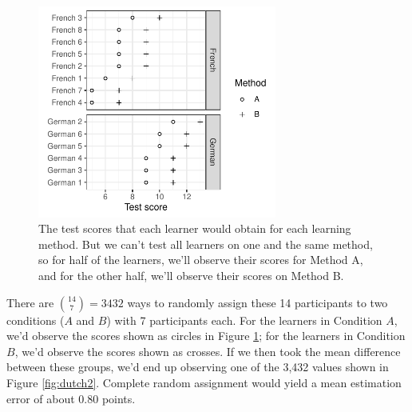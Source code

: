 \documentclass[a4paper]{tufte-book}\usepackage[]{graphicx}\usepackage[]{xcolor}
\begin{document}
\begin{figure}[htbp]
  \centering
  \includegraphics[width = 0.7\textwidth]{figure/dutch-1}
  \caption{The test scores that each learner would obtain for each learning method. But we can't test all learners on one and the same method, so for half of the learners, we'll observe their scores for Method A, and for the other half, we'll observe their scores on Method B.}
  \label{fig:dutch}
\end{figure}

There are ${14 \choose 7} = 3432$ ways to randomly assign these 14 participants to
two conditions ($A$ and $B$) with 7 participants each.
For the learners in Condition $A$, we'd observe the scores
shown as circles in Figure \ref{fig:dutch};
for the learners in Condition $B$, we'd observe the scores
shown as crosses. If we then took the mean difference between
these groups, we'd end up observing one of the 3,432 values
shown in Figure \vref{fig:dutch2}. Complete random assignment
would yield a mean estimation error of about 0.80 points.
\end{document}
